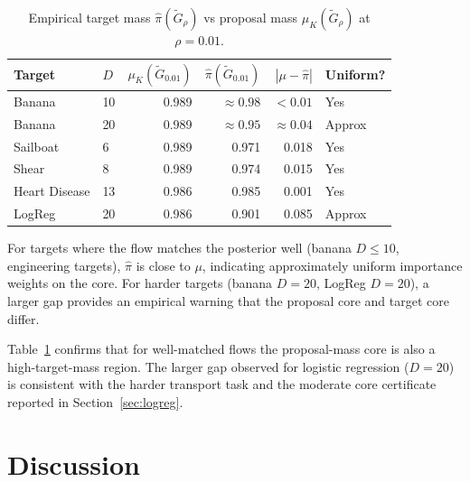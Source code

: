 \documentclass[12pt]{article}
\begin{document}
\begin{table}[t]
\centering
\caption{Empirical target mass $\hat{\pi}(\tilde{G}_\rho)$ vs proposal mass $\mu_K(\tilde{G}_\rho)$ at $\rho = 0.01$.}
\label{tab:target-mass}
\begin{tabular}{llrrrl}
\toprule
Target & $D$ & $\mu_K(\tilde{G}_{0.01})$ & $\hat{\pi}(\tilde{G}_{0.01})$ & $|\mu - \hat{\pi}|$ & Uniform? \\
\midrule
Banana     & 10 & 0.989 & $\approx 0.98$ & $< 0.01$ & Yes \\
Banana     & 20 & 0.989 & $\approx 0.95$ & $\approx 0.04$ & Approx \\
Sailboat   & 6  & 0.989 & 0.971 & 0.018 & Yes \\
Shear      & 8  & 0.989 & 0.974 & 0.015 & Yes \\
Heart Disease & 13 & 0.986 & 0.985 & 0.001 & Yes \\
LogReg     & 20 & 0.986 & 0.901 & 0.085 & Approx \\
\bottomrule
\end{tabular}

\smallskip
\begin{minipage}{\linewidth}
\small For targets where the flow matches the posterior well (banana $D \le 10$, engineering targets), $\hat{\pi}$ is close to $\mu$, indicating approximately uniform importance weights on the core. For harder targets (banana $D=20$, LogReg $D=20$), a larger gap provides an empirical warning that the proposal core and target core differ.
\end{minipage}
\end{table}

Table~\ref{tab:target-mass} confirms that for well-matched flows the proposal-mass core is also a high-target-mass region. The larger gap observed for logistic regression ($D = 20$) is consistent with the harder transport task and the moderate core certificate reported in Section~\ref{sec:logreg}.


\section{Discussion}\label{sec:discussion}
\end{document}
